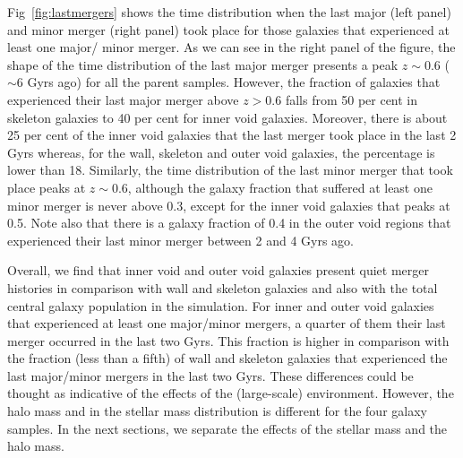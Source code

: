 \documentclass[a4paper,fleqn,usenatbib,letter]{mnras}
\begin{document}
 
 Fig~\ref{fig:lastmergers} shows the time distribution when the last major (left panel) and minor merger (right panel) took place for those galaxies that experienced at least one major/ minor merger. As we can see in the right panel of the figure, the shape of the time distribution of the last major merger presents a peak $z\sim 0.6$ ($\sim 6$ Gyrs ago) for all the parent samples. However, the fraction of galaxies that experienced their last major merger above $z>0.6$ falls from  50 per cent in skeleton galaxies to 40 per cent for inner void galaxies. Moreover, there is about 25 per cent of the inner void galaxies that the last merger took place in the last 2 Gyrs whereas, for the wall, skeleton and  outer void galaxies, the percentage is lower than 18.     Similarly, the time distribution of the last  minor merger that took place peaks at $z\sim 0.6$, although  the galaxy fraction that suffered at least one minor merger is never above 0.3, except for the inner void galaxies  that peaks at  0.5. Note also that there is a galaxy fraction of 0.4 in the outer void regions that experienced their last minor merger between 2 and 4 Gyrs ago. 
 
 Overall, we find that inner void and outer void galaxies present quiet merger histories in comparison with wall and skeleton galaxies and also with the total  central galaxy population in the simulation. For inner and outer void galaxies that experienced at least one major/minor mergers, a quarter of them their last merger occurred in the last two Gyrs. This fraction is higher in comparison with  the fraction (less than  a fifth) of  wall and skeleton galaxies that experienced the last major/minor mergers in the last two Gyrs.  These differences could be thought as indicative of the effects of the (large-scale) environment. However, the halo mass and in the stellar mass distribution is different for the four galaxy samples. In the next sections,  we separate the effects of the stellar mass and the halo mass. 
 
 
\end{document}
